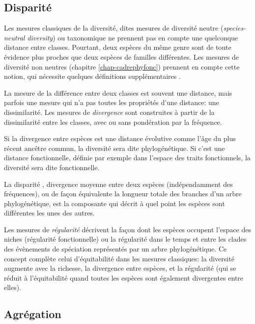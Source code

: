 \documentclass[
  11pt,
  american,
  a4paper,
  extrafontsizes,onecolumn,openright
  ]{memoir}
\newlength{\rf}
\begin{document}
\hypertarget{disparituxe9}{%
\subsection{Disparité}\label{disparituxe9}}

Les mesures classiques de la diversité, dites mesures de diversité neutre (\emph{species-neutral diversity}) ou taxonomique ne prennent pas en compte une quelconque distance entre classes.
Pourtant, deux espèces du même genre sont de toute évidence plus proches que deux espèces de familles différentes.
Les mesures de diversité non neutres (chapitre \ref{chap-cadrephyfonc}) prennent en compte cette notion, qui nécessite quelques définitions supplémentaires \autocite{Mouillot2005,Ricotta2007}.

La mesure de la différence entre deux classes est souvent une distance, mais parfois une mesure qui n'a pas toutes les propriétés d'une distance: une dissimilarité.
Les mesures de \emph{divergence} \autocite{Pavoine2011} sont construites à partir de la dissimilarité entre les classes, avec ou sans pondération par la fréquence.

Si la divergence entre espèces est une distance évolutive comme l'âge du plus récent ancêtre commun, la diversité sera dite phylogénétique.
Si c'est une distance fonctionnelle, définie par exemple dans l'espace des traits fonctionnels, la diversité sera dite fonctionnelle.

La disparité \autocite{Runnegar1987}, divergence moyenne entre deux espèces (indépendamment des fréquences), ou de façon équivalente la longueur totale des branches d'un arbre phylogénétique, est la composante qui décrit à quel point les espèces sont différentes les unes des autres.

Les mesures de \emph{régularité} décrivent la façon dont les espèces occupent l'espace des niches (régularité fonctionnelle) ou la régularité dans le temps et entre les clades des évènements de spéciation représentés par un arbre phylogénétique.
Ce concept complète celui d'équitabilité dans les mesures classiques: la diversité augmente avec la richesse, la divergence entre espèces, et la régularité (qui se réduit à l'équitabilité quand toutes les espèces sont également divergentes entre elles).

\hypertarget{agruxe9gation}{%
\subsection{Agrégation}\label{agruxe9gation}}
\end{document}
